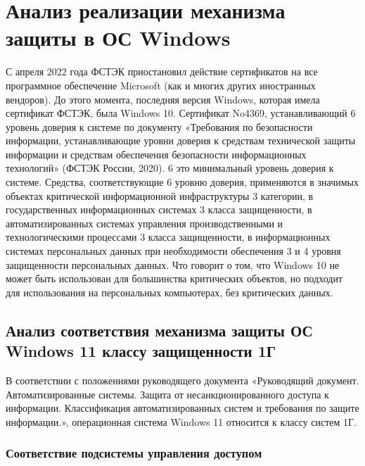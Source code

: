 \documentclass[a4paper, 14pt]{report}
\begin{document}
\section{Анализ реализации механизма защиты в ОС Windows}
С апреля 2022 года ФСТЭК приостановил действие сертификатов на все программное обеспечение Microsoft (как и многих других иностранных вендоров).
До этого момента, последняя версия Windows, которая имела сертификат ФСТЭК, была Windows 10. Сертификат No4369, устанавливающий 6 уровень доверия к системе по документу
«Требования по безопасности информации, устанавливающие уровни доверия к
средствам технической защиты информации и средствам обеспечения безопасности
информационных технологий» (ФСТЭК России, 2020). 6 это минимальный уровень доверия к системе.
Средства, соответствующие 6 уровню доверия, применяются в значимых объектах критической информационной инфраструктуры 3 категории, в государственных информационных системах 3 класса защищенности, в автоматизированных системах управления производственными и технологическими процессами 3 класса защищенности, в информационных системах персональных данных при необходимости обеспечения 3 и 4 уровня защищенности персональных данных.
Что говорит о том, что Windows 10 не может быть использован для большинства критических объектов, но подходит для использования на персональных компьютерах, без критических данных.

\subsection{Анализ соответствия механизма защиты ОС Windows 11 классу защищенности 1Г}
В соответствии с положениями руководящего документа «Руководящий документ. Автоматизированные системы. Защита от несанкционированного доступа к информации. Классификация автоматизированных систем и требования по защите информации.», операционная система Windows 11 относится к классу систем 1Г.
\subsubsection{Соответствие подсистемы управления доступом}
\end{document}
